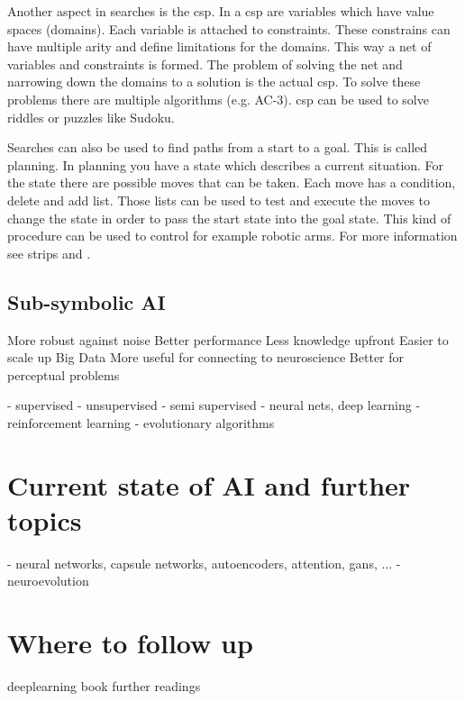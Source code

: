 \documentclass[jou,apacite]{apa6}
\begin{document}
Another aspect in searches is the \gls{csp}. In a \gls{csp} are variables which have value spaces (domains). Each variable is attached to constraints. These constrains can have multiple arity and define limitations for the domains. 
This way a net of variables and constraints is formed. The problem of solving the net and narrowing down the domains to a solution is the actual \gls{csp}. To solve these problems there are multiple algorithms (e.g. AC-3). \gls{csp} can be used to solve riddles or puzzles like Sudoku.

Searches can also be used to find paths from a start to a goal. This is called planning. In planning you have a state which describes a current situation. For the state there are possible moves that can be taken. Each move has a condition, delete and add list. Those lists can be used to test and execute the moves to change the state in order to pass the start state into the goal state. This kind of procedure can be used to control for example robotic arms. For more information see \gls{strips} and \cite{Nilsson1982}.

\subsection{Sub-symbolic AI}
More robust against noise
Better performance
Less knowledge upfront
Easier to scale up
Big Data
More useful for connecting to
neuroscience
Better for perceptual
problems

  - supervised
  - unsupervised
  - semi supervised
   - neural nets, deep learning
  - reinforcement learning
  - evolutionary algorithms

\section{Current state of AI and further topics}
 - neural networks, capsule networks, autoencoders, attention, gans, ...
 - neuroevolution

\section{Where to follow up}
deeplearning book
further readings

\printglossaries
\printindex

\end{document}
